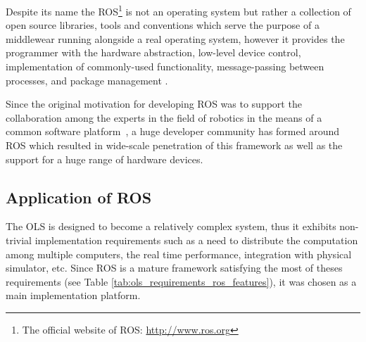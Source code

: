 Despite its name the ROS\footnote{The official website of ROS: \url{http://www.ros.org}} is not an operating system but rather a collection of open source libraries, tools and conventions which serve the purpose of a middlewear running alongside a real operating system, however it provides the programmer with the hardware abstraction,  low-level device control, implementation of commonly-used functionality,
message-passing between processes, and package management \cite{O'Kane201310}.

Since the original motivation for developing ROS was to support the collaboration among the experts in the field of robotics in the means of a common software platform~\cite{ROS-an-open-source-Robot-Operating-System}, a huge developer community has formed around ROS which resulted in wide-scale penetration of this framework as well as the support for a huge range of hardware devices.

\subsection{Application of ROS}

The OLS is designed to become a relatively complex system, thus it exhibits non-trivial implementation requirements such as a need to distribute the computation among multiple computers, the real time performance, integration with physical simulator, etc. Since ROS is a mature framework satisfying the most of theses requirements (see Table \ref{tab:ols_requirements_ros_features}), it was chosen as a main implementation platform.


